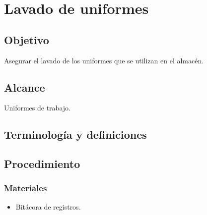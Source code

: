 \renewcommand{\MenorVer}{0}
\renewcommand{\MayorVer}{2}
\renewcommand{\Codigo}{HYS-18-IT}
\renewcommand{\FechaPub}{2023--01}
\renewcommand{\Titulo}{Lavado de uniformes}

\section{\Titulo}

\subsection{Objetivo}

Asegurar el lavado de los uniformes que se utilizan en el almacén.

\subsection{Alcance}

Uniformes de trabajo.

\subsection{Terminología y definiciones}

\begin{description}
\end{description}



\subsection{Procedimiento}

\subsubsection{Materiales}

\begin{itemize}
	\item Bitácora de registros.
\end{itemize}


